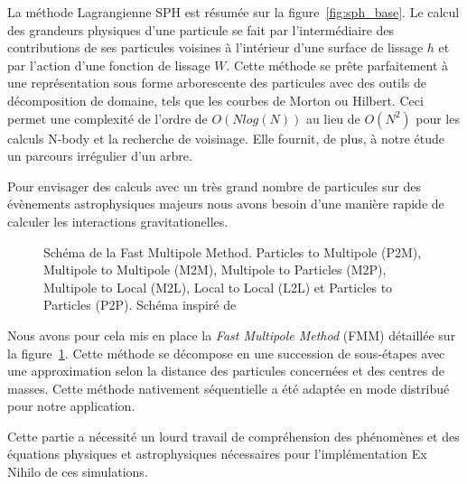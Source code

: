\documentclass[12pt,a4paper]{report}
\begin{document}
La méthode Lagrangienne SPH est résumée sur la figure~\ref{fig:sph_base}.
Le calcul des grandeurs physiques d'une particule se fait par l'intermédiaire des contributions de ses particules voisines à l'intérieur d'une surface de lissage $h$ et par l'action d'une fonction de lissage $W$. 
Cette méthode se prête parfaitement à une représentation sous forme arborescente des particules avec des outils de décomposition de domaine, tels que les courbes de Morton ou Hilbert. 
Ceci permet une complexité de l'ordre de $O(Nlog(N))$ au lieu de $O(N^2)$ pour les calculs N-body et la recherche de voisinage. 
Elle fournit, de plus, à notre étude un parcours irrégulier d'un arbre. 

Pour envisager des calculs avec un très grand nombre de particules sur des évènements astrophysiques majeurs nous avons besoin d'une manière rapide de calculer les interactions gravitationelles. 

\begin{figure}[ht!]

\caption{Schéma de  la Fast Multipole Method. Particles to Multipole (P2M), Multipole to Multipole (M2M), Multipole to Particles (M2P), Multipole to Local (M2L), Local to Local (L2L) et Particles to Particles (P2P). Schéma inspiré de~\cite{yokota2011treecode}}
\label{fig:gravitation_fmm}
\end{figure}

Nous avons pour cela mis en place la \textit{Fast Multipole Method} (FMM) détaillée sur la figure~\ref{fig:gravitation_fmm}.
Cette méthode se décompose en une succession de sous-étapes avec une approximation selon la distance des particules concernées et des centres de masses. 
Cette méthode nativement séquentielle a été adaptée en mode distribué pour notre application. 

Cette partie a nécessité un lourd travail de compréhension des phénomènes et des équations physiques et astrophysiques nécessaires pour l'implémentation Ex Nihilo de ces simulations.
\end{document}
